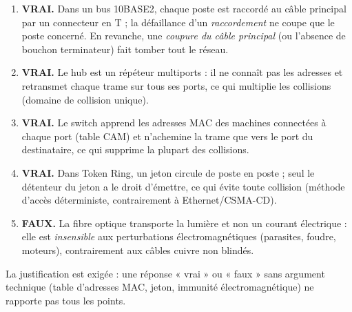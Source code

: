 \documentclass[11pt]{article}
\begin{document}
\begin{corrige}

\begin{enumerate}
    \item \textbf{VRAI.} Dans un bus 10BASE2, chaque poste est raccordé au câble principal par un connecteur en T ; la défaillance d'un \emph{raccordement} ne coupe que le poste concerné. En revanche, une \emph{coupure du câble principal} (ou l'absence de bouchon terminateur) fait tomber tout le réseau.
    \item \textbf{VRAI.} Le hub est un répéteur multiports : il ne connaît pas les adresses et retransmet chaque trame sur tous ses ports, ce qui multiplie les collisions (domaine de collision unique).
    \item \textbf{VRAI.} Le switch apprend les adresses MAC des machines connectées à chaque port (table CAM) et n'achemine la trame que vers le port du destinataire, ce qui supprime la plupart des collisions.
    \item \textbf{VRAI.} Dans Token Ring, un jeton circule de poste en poste ; seul le détenteur du jeton a le droit d'émettre, ce qui évite toute collision (méthode d'accès déterministe, contrairement à Ethernet/CSMA-CD).
    \item \textbf{FAUX.} La fibre optique transporte la lumière et non un courant électrique : elle est \emph{insensible} aux perturbations électromagnétiques (parasites, foudre, moteurs), contrairement aux câbles cuivre non blindés.
\end{enumerate}

\begin{attention}
La justification est exigée : une réponse « vrai » ou « faux » sans argument technique (table d'adresses MAC, jeton, immunité électromagnétique) ne rapporte pas tous les points.
\end{attention}
\end{corrige}
\end{document}
